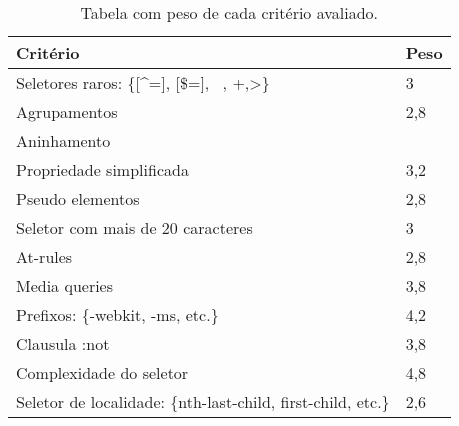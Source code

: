 \begin{table}[]
	\centering
	\caption{Tabela com peso de cada critério avaliado.}
	\label{tab:tabelaPesos}
	\begin{tabular}{l|l}
		\textbf{Critério}                                                           & \textbf{Peso} \\ \hline
		Seletores raros: \{{[}\textasciicircum ={]}, {[}\$={]}, ~, +,\textgreater\} & 3             \\
		Agrupamentos                                                                & 2,8           \\
		Aninhamento                                                                 &               \\
		Propriedade simplificada                                                    & 3,2           \\
		Pseudo elementos                                                            & 2,8           \\
		Seletor com mais de 20 caracteres                                           & 3             \\
		At-rules                                                                    & 2,8           \\
		Media queries                                                               & 3,8           \\
		Prefixos: \{-webkit, -ms, etc.\}                                            & 4,2           \\
		Clausula :not                                                               & 3,8           \\
		Complexidade do seletor                                                     & 4,8           \\
		Seletor de localidade: \{nth-last-child, first-child, etc.\}                & 2,6          
	\end{tabular}
\end{table}